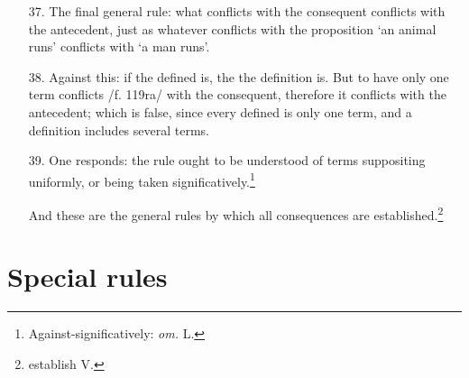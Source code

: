 \documentclass[]{article}
\begin{document}
\begin{enumerate}
	\item[37.] The final general rule: what conflicts with the consequent conflicts with the antecedent, just as whatever conflicts with the proposition `an animal runs' conflicts with `a man runs'. 
	\item[38.] Against this: if the defined is, the the definition is. But to have only one term conflicts /f. 119ra/ with the consequent, therefore it conflicts with the antecedent; which is false, since every defined is only one term, and a definition includes several terms. 
	\item[39.] One responds: the rule ought to be understood of terms suppositing uniformly, or being taken significatively.\footnote{Against-significatively: \textit{om.} L.}
	
	And these are the general rules by which all consequences are established.\footnote{establish V.}	
\end{enumerate}
\section{Special rules}
\end{document}
